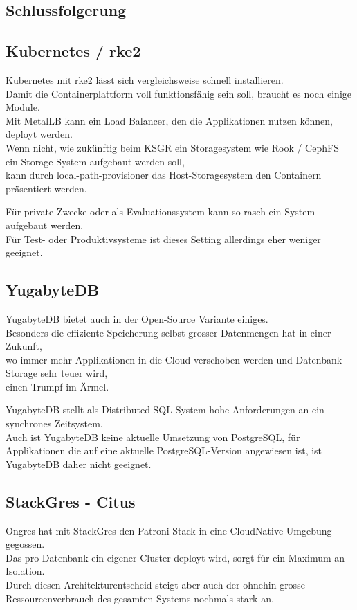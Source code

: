 
\begin{flushleft}
    \section{Schlussfolgerung}
    \subsection{\Gls{Kubernetes} / \gls{rke2}}
    \Gls{Kubernetes} mit \gls{rke2} lässt sich vergleichsweise schnell installieren.\\
    Damit die Containerplattform voll funktionsfähig sein soll, braucht es noch einige Module.\\
    Mit \Gls{MetalLB} kann ein Load Balancer, den die Applikationen nutzen können, deployt werden.\\
    Wenn nicht, wie zukünftig beim KSGR ein Storagesystem wie Rook / CephFS ein Storage System aufgebaut werden soll,\\
    kann durch \gls{local-path-provisioner} das Host-Storagesystem den Containern präsentiert werden.
\end{flushleft}
\begin{flushleft}
    Für private Zwecke oder als Evaluationssystem kann so rasch ein System aufgebaut werden.\\
    Für Test- oder Produktivsysteme ist dieses Setting allerdings eher weniger geeignet.
    \subsection{YugabyteDB}
    YugabyteDB bietet auch in der Open-Source Variante einiges.\\
    Besonders die effiziente Speicherung selbst grosser Datenmengen hat in einer Zukunft,\\
    wo immer mehr Applikationen in die Cloud verschoben werden und Datenbank Storage sehr teuer wird,\\
    einen Trumpf im Ärmel.
\end{flushleft}
\begin{flushleft}
    YugabyteDB stellt als Distributed SQL System hohe Anforderungen an ein synchrones Zeitsystem.\\
    Auch ist YugabyteDB keine aktuelle Umsetzung von \Gls{PostgreSQL}, für Applikationen die auf eine aktuelle \Gls{PostgreSQL}-Version angewiesen ist, ist YugabyteDB daher nicht geeignet.
    \subsection{StackGres - Citus}
    Ongres hat mit StackGres den Patroni Stack in eine CloudNative Umgebung gegossen.\\
    Das pro Datenbank ein eigener Cluster deployt wird, sorgt für ein Maximum an Isolation.\\
    Durch diesen Architekturentscheid steigt aber auch der ohnehin grosse Ressourcenverbrauch des gesamten Systems nochmals stark an.
\end{flushleft}
